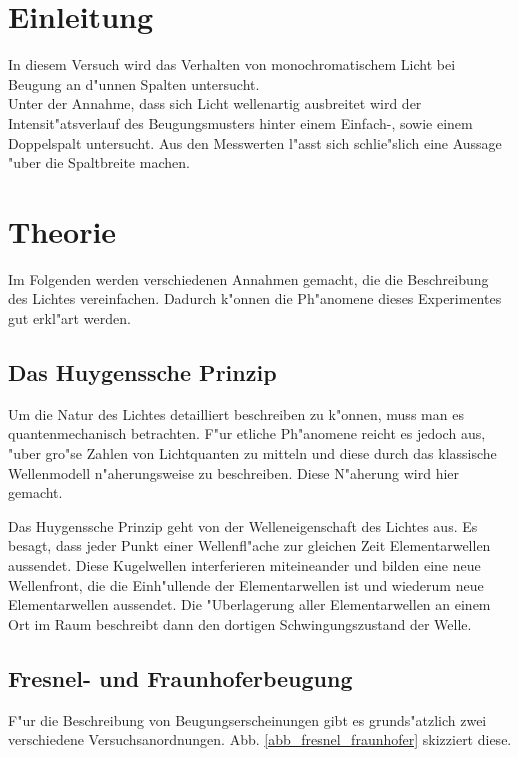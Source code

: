\section{Einleitung}
	\label{sec:einleitung}
	In diesem Versuch wird das Verhalten von monochromatischem Licht bei Beugung an d"unnen Spalten untersucht.\\
	Unter der Annahme, dass sich Licht wellenartig ausbreitet wird der Intensit"atsverlauf des Beugungsmusters hinter einem Einfach-, sowie einem Doppelspalt untersucht.
	Aus den Messwerten l"asst sich schlie"slich eine Aussage "uber die Spaltbreite machen.

\section{Theorie}
	\label{sec:theorie}

	Im Folgenden werden verschiedenen Annahmen gemacht, die die Beschreibung des Lichtes vereinfachen.
	Dadurch k"onnen die Ph"anomene dieses Experimentes gut erkl"art werden.

	\subsection{Das Huygenssche Prinzip}

		Um die Natur des Lichtes detailliert beschreiben zu k"onnen, muss man es quan\-ten\-me\-cha\-nisch betrachten.
		F"ur etliche Ph"anomene reicht es jedoch aus, "uber gro"se Zahlen von Lichtquanten zu mitteln und diese durch das klassische Wellenmodell n"aherungsweise zu beschreiben.
		Diese N"aherung wird hier gemacht.

		Das Huygenssche Prinzip geht von der Welleneigenschaft des Lichtes aus.
		Es besagt, dass jeder Punkt einer Wellenfl"ache zur gleichen Zeit Elementarwellen aussendet.
		Diese Kugelwellen interferieren miteineander und bilden eine neue Wellenfront,
		die die Ein\-h"ul\-len\-de der Elementarwellen ist und wiederum neue Elementarwellen aussendet.
		Die "Uberlagerung aller Elementarwellen an einem Ort im Raum beschreibt dann den dortigen Schwingungszustand der Welle.

	\subsection{Fresnel- und Fraunhoferbeugung}
		\label{subsec:beugung}

		F"ur die Beschreibung von Beugungserscheinungen gibt es grunds"atzlich zwei verschiedene Versuchsanordnungen. Abb. \ref{abb_fresnel_fraunhofer} skizziert diese.

